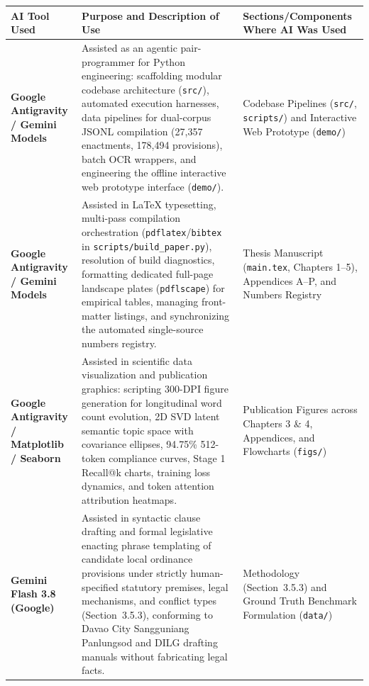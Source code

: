 \documentclass[11pt,letterpaper]{article}
\newif\iffilled
\begin{document}
\vspace{0.06cm}

\iffilled
  \fontsize{8.5pt}{11pt}\selectfont
  \begin{tabularx}{\textwidth}{@{}>{\raggedright\arraybackslash}p{2.8cm} X >{\raggedright\arraybackslash}p{4.2cm}@{}}
    \textbf{AI Tool Used} & \textbf{Purpose and Description of Use} & \textbf{Sections/Components Where AI Was Used} \\[3pt]
    \midrule
    \textbf{Google Antigravity / Gemini Models} &
    Assisted as an agentic pair-programmer for Python engineering: scaffolding modular codebase architecture (\texttt{src/}), automated execution harnesses, data pipelines for dual-corpus JSONL compilation (27,357 enactments, 178,494 provisions), batch OCR wrappers, and engineering the offline interactive web prototype interface (\texttt{demo/}). &
    Codebase Pipelines (\texttt{src/}, \texttt{scripts/}) and Interactive Web Prototype (\texttt{demo/}) \\[3pt]
    
    \textbf{Google Antigravity / Gemini Models} &
    Assisted in LaTeX typesetting, multi-pass compilation orchestration (\texttt{pdflatex}/\texttt{bibtex} in \texttt{scripts/build\_paper.py}), resolution of build diagnostics, formatting dedicated full-page landscape plates (\texttt{pdflscape}) for empirical tables, managing front-matter listings, and synchronizing the automated single-source numbers registry. &
    Thesis Manuscript (\texttt{main.tex}, Chapters 1--5), Appendices A--P, and Numbers Registry \\[3pt]

    \textbf{Google Antigravity / Matplotlib / Seaborn} &
    Assisted in scientific data visualization and publication graphics: scripting 300-DPI figure generation for longitudinal word count evolution, 2D SVD latent semantic topic space with covariance ellipses, 94.75\% 512-token compliance curves, Stage 1 Recall@k charts, training loss dynamics, and token attention attribution heatmaps. &
    Publication Figures across Chapters 3 \& 4, Appendices, and Flowcharts (\texttt{figs/}) \\[3pt]
    
    \textbf{Gemini Flash 3.8 (Google)} &
    Assisted in syntactic clause drafting and formal legislative enacting phrase templating of candidate local ordinance provisions under strictly human-specified statutory premises, legal mechanisms, and conflict types (Section~3.5.3), conforming to Davao City Sangguniang Panlungsod and DILG drafting manuals without fabricating legal facts. &
    Methodology (Section~3.5.3) and Ground Truth Benchmark Formulation (\texttt{data/}) \\[2pt]
  \end{tabularx}
\end{document}
